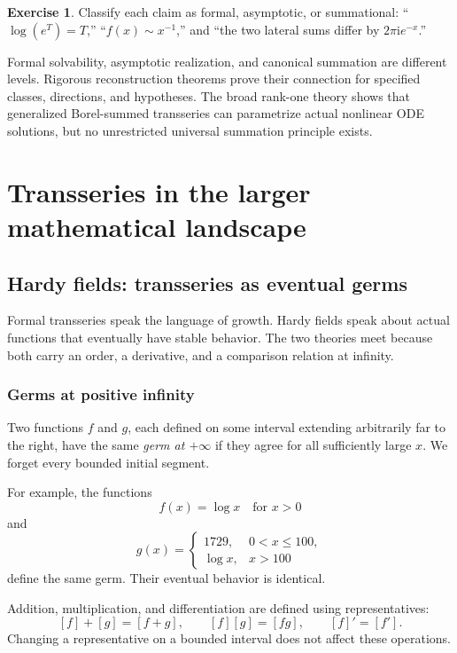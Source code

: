 \documentclass[11pt,openany]{book}
\theoremstyle{definition}
\newtheorem{exercise}{Exercise}[chapter]
\theoremstyle{plain}
\theoremstyle{remark}
\newcommand{\ii}{\mathrm{i}}
\begin{document}
\begin{exercise}
Classify each claim as formal, asymptotic, or summational: ``$\log(e^T)=T$,'' ``$f(x)\sim x^{-1}$,'' and ``the two lateral sums differ by $2\pi\ii e^{-x}$.''
\end{exercise}

\begin{summarybox}
Formal solvability, asymptotic realization, and canonical summation are different levels. Rigorous reconstruction theorems prove their connection for specified classes, directions, and hypotheses. The broad rank-one theory shows that generalized Borel-summed transseries can parametrize actual nonlinear ODE solutions, but no unrestricted universal summation principle exists.
\end{summarybox}

\part{Transseries in the larger mathematical landscape}

\chapter{Hardy fields: transseries as eventual germs}\label{ch:hfields}

Formal transseries speak the language of growth. Hardy fields speak about actual functions that eventually have stable behavior. The two theories meet because both carry an order, a derivative, and a comparison relation at infinity.

\section{Germs at positive infinity}

Two functions $f$ and $g$, each defined on some interval extending arbitrarily far to the right, have the same \emph{germ at $+\infty$} if they agree for all sufficiently large $x$. We forget every bounded initial segment.

For example, the functions
\[
 f(x)=\log x
 \quad\text{for }x>0
\]
and
\[
 g(x)=
 \begin{cases}
 1729,&0<x\le100,\\
 \log x,&x>100
 \end{cases}
\]
define the same germ. Their eventual behavior is identical.

Addition, multiplication, and differentiation are defined using representatives:
\[
 [f]+[g]=[f+g],
 \qquad
 [f][g]=[fg],
 \qquad
 [f]'=[f'].
\]
Changing a representative on a bounded interval does not affect these operations.
\end{document}
